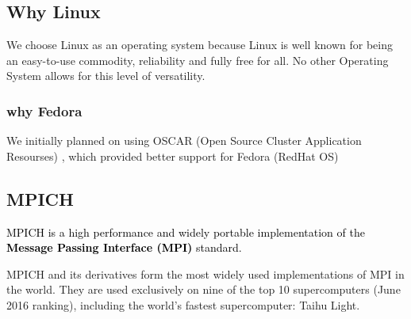 \documentclass[a4paper]{article}
\newcommand\textstyleStrongEmphasis[1]{\textbf{#1}}
\begin{document}
\subsection[]{}
\subsection{}
\subsection{}
\subsection{}
\subsection{}
\subsection{}
\subsection{}
\subsection{Why Linux}
We choose Linux as an operating system because Linux is well known for being an easy-to-use commodity, reliability and
fully free for all. No other Operating System allows for this level of versatility.

\subsubsection[why Fedora]{\bfseries why Fedora}
We initially planned on using OSCAR (Open Source Cluster Application Resourses) , which provided better support for
Fedora (RedHat OS)


\bigskip

\subsection[MPICH]{MPICH}
\textcolor{black}{MPICH is a high performance and widely portable implementation of the
}\textstyleStrongEmphasis{\textmd{\textcolor{black}{Message Passing Interface (MPI)}}}\textcolor{black}{ standard.}

{\color{black}
MPICH and its derivatives form the most widely used implementations of MPI in the world. They are used exclusively on
nine of the top 10 supercomputers (June 2016 ranking), including the world's fastest supercomputer: Taihu Light.}
\end{document}

